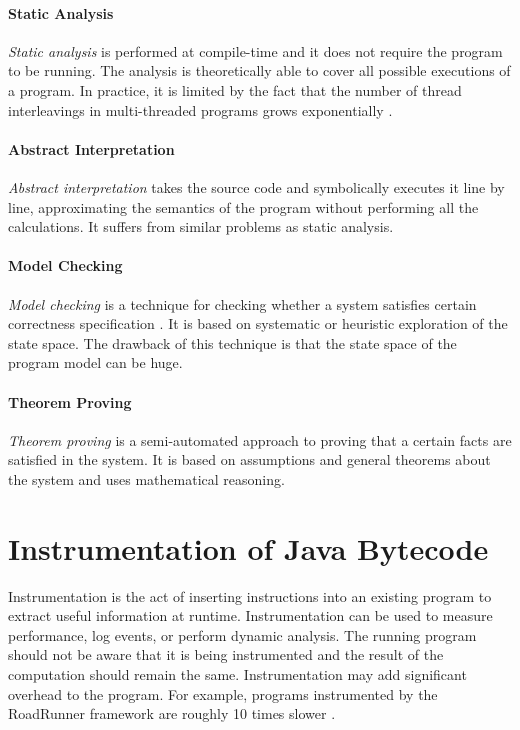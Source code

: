 \paragraph{Static Analysis}
\emph{Static analysis} is performed at compile-time and it does not require the
program to be running. The analysis is theoretically able to cover all possible
executions of a program. In practice, it is limited by the fact that the number
of thread interleavings in multi-threaded programs grows exponentially
\cite{letko}.

\paragraph{Abstract Interpretation}
\emph{Abstract interpretation} takes the source code and symbolically executes
it line by line, approximating the semantics of the program without performing
all the calculations. It suffers from similar problems as static analysis.

\paragraph{Model Checking}
\emph{Model checking} is a technique for checking whether a system satisfies
certain correctness specification \cite{letko}. It is based on systematic or
heuristic exploration of the state space. The drawback of this technique is that
the state space of the program model can be huge.

\paragraph{Theorem Proving}
\emph{Theorem proving} is a semi-automated approach to proving that a certain
facts are satisfied in the system. It is based on assumptions and general
theorems about the system and uses mathematical reasoning.

\section{Instrumentation of Java Bytecode}

Instrumentation is the act of inserting instructions into an existing program to
extract useful information at runtime. Instrumentation can be used to measure
performance, log events, or perform dynamic analysis. The running program should
not be aware that it is being instrumented and the result of the computation
should remain the same. Instrumentation may add significant overhead to the
program. For example, programs instrumented by the RoadRunner framework are
roughly 10 times slower \cite{RoadRunner}.

